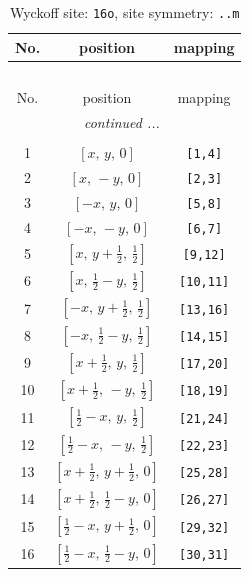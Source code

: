 \documentclass[fleqn,8pt]{jsarticle}
\begin{document}
\renewcommand{\arraystretch}{1.2}
\begin{longtable}{ccc}
\caption{Wyckoff site: {\tt 16o}, site symmetry: {\tt ..m}}
 \\
 \hline \hline
No. & position & mapping \\ \hline \endfirsthead

\multicolumn{2}{l}{\tablename\ \thetable{}} \\
 \hline \hline
No. & position & mapping \\ \hline \endhead

 \hline \hline
\multicolumn{2}{r}{\footnotesize\it continued ...} \\ \endfoot

 \hline \hline
\multicolumn{2}{r}{} \\ \endlastfoot

1 & $\left[ x,\, y,\, 0 \right]$ & {\tt [1,4]} \\ \hline
2 & $\left[ x,\, - y,\, 0 \right]$ & {\tt [2,3]} \\ \hline
3 & $\left[ - x,\, y,\, 0 \right]$ & {\tt [5,8]} \\ \hline
4 & $\left[ - x,\, - y,\, 0 \right]$ & {\tt [6,7]} \\ \hline
5 & $\left[ x,\, y + \frac{1}{2},\, \frac{1}{2} \right]$ & {\tt [9,12]} \\ \hline
6 & $\left[ x,\, \frac{1}{2} - y,\, \frac{1}{2} \right]$ & {\tt [10,11]} \\ \hline
7 & $\left[ - x,\, y + \frac{1}{2},\, \frac{1}{2} \right]$ & {\tt [13,16]} \\ \hline
8 & $\left[ - x,\, \frac{1}{2} - y,\, \frac{1}{2} \right]$ & {\tt [14,15]} \\ \hline
9 & $\left[ x + \frac{1}{2},\, y,\, \frac{1}{2} \right]$ & {\tt [17,20]} \\ \hline
10 & $\left[ x + \frac{1}{2},\, - y,\, \frac{1}{2} \right]$ & {\tt [18,19]} \\ \hline
11 & $\left[ \frac{1}{2} - x,\, y,\, \frac{1}{2} \right]$ & {\tt [21,24]} \\ \hline
12 & $\left[ \frac{1}{2} - x,\, - y,\, \frac{1}{2} \right]$ & {\tt [22,23]} \\ \hline
13 & $\left[ x + \frac{1}{2},\, y + \frac{1}{2},\, 0 \right]$ & {\tt [25,28]} \\ \hline
14 & $\left[ x + \frac{1}{2},\, \frac{1}{2} - y,\, 0 \right]$ & {\tt [26,27]} \\ \hline
15 & $\left[ \frac{1}{2} - x,\, y + \frac{1}{2},\, 0 \right]$ & {\tt [29,32]} \\ \hline
16 & $\left[ \frac{1}{2} - x,\, \frac{1}{2} - y,\, 0 \right]$ & {\tt [30,31]} \\
\end{longtable}
\end{document}
